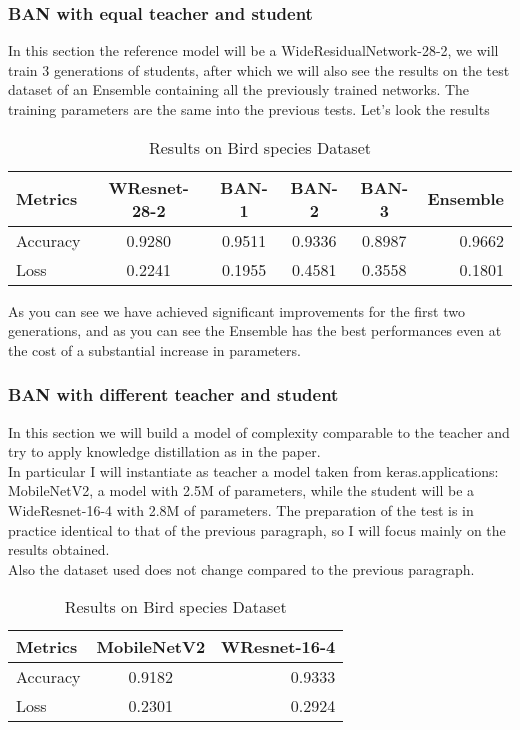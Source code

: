 \subsubsection{BAN with equal teacher and student}
In this section the reference model will be a WideResidualNetwork-28-2, we will train 3 generations of students, after which we will also see the results on the test dataset of an Ensemble containing all the previously trained networks. The training parameters are the same into the previous tests. Let's look the results
\begin{table}[h!]
  \begin{center}
    \caption{Results on Bird species Dataset}
    \begin{tabular}{l|c|c|c|c|r} 
      \textbf{Metrics} & \textbf{WResnet-28-2} & \textbf{BAN-1} & \textbf{BAN-2} & \textbf{BAN-3} & \textbf{Ensemble}\\ 
      \hline
      Accuracy & 0.9280 & 0.9511 & 0.9336 & 0.8987 & 0.9662\\
      Loss & 0.2241 & 0.1955 & 0.4581 & 0.3558 & 0.1801\\

    \end{tabular}
  \end{center}
\end{table}

As you can see we have achieved significant improvements for the first two generations, and as you can see the Ensemble has the best performances even at the cost of a substantial increase in parameters.
\subsubsection{BAN with different teacher and student}
In this section we will build a model of complexity comparable to the teacher and try to apply knowledge distillation as in the paper.\\
In particular I will instantiate as teacher a model taken from keras.applications: MobileNetV2, a model with 2.5M of parameters, while the student will be a WideResnet-16-4 with 2.8M of parameters. The preparation of the test is in practice identical to that of the previous paragraph, so I will focus mainly on the results obtained.\\
Also the dataset used does not change compared to the previous paragraph.

\begin{table}[h!]
  \begin{center}
    \caption{Results on Bird species Dataset}
    \begin{tabular}{l|c|r} 
      \textbf{Metrics} & \textbf{MobileNetV2} & \textbf{WResnet-16-4}\\ 
      \hline
      Accuracy & 0.9182 & 0.9333 \\
      Loss & 0.2301 & 0.2924 \\

    \end{tabular}
  \end{center}
\end{table}

